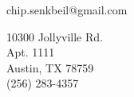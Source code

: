 \documentclass[10pt,a4paper]{article}
\author{Robert C. Senkbeil}
\begin{document}
\thispagestyle{empty}

 {
    chip.senkbeil@gmail.com
}

\address{
    10300 Jollyville Rd.            \\
    Apt. 1111                       \\
    Austin, TX 78759                \\
    (256) 283-4357
} {
    10300 Jollyville Rd.            \\
    Apt. 1111                       \\
    Austin, TX 78759                \\
    (256) 283-4357
}
\end{document}
